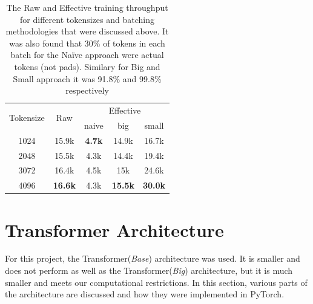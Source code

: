 \documentclass[12pt,a4paper,twoside,openright]{report}
\begin{document}
\begin{table}[]
\centering
\begin{tabular}{ccccc}
\toprule
\multirow{2}{*}{Tokensize} & \multirow{2}{*}{Raw} & \multicolumn{3}{c}{Effective} \\
\cmidrule(l){3-5}
                           &                      & naive    & big      & small  \\
                           \midrule \midrule
1024                       & 15.9k                & \textbf{4.7k}     & 14.9k    & 16.7k   \\
2048                       & 15.5k                & 4.3k     & 14.4k    & 19.4k   \\
3072                       & 16.4k                & 4.5k     & 15k    & 24.6k   \\
4096                       & \textbf{16.6k}                 & 4.3k     & \textbf{15.5k}    & \textbf{30.0k}  \\
\bottomrule
\end{tabular}
\caption{The Raw and Effective training throughput for different tokensizes and batching methodologies that were discussed above. It was also found that 30\% of tokens in each batch for the Na\"ive approach were actual tokens (not pads). Similary for Big and Small approach it was 91.8\% and 99.8\% respectively}
\label{table:raw-and-effective-throughpu}
\end{table}



\section{Transformer Architecture}
\label{transformer-architecture}

For this project, the Transformer(\textit{Base}) architecture was used. It is smaller and does not perform as well as the Transformer(\textit{Big}) architecture, but it is much smaller and meets our computational restrictions. In this section, various parts of the architecture are discussed and how they were implemented in PyTorch. 
\end{document}
